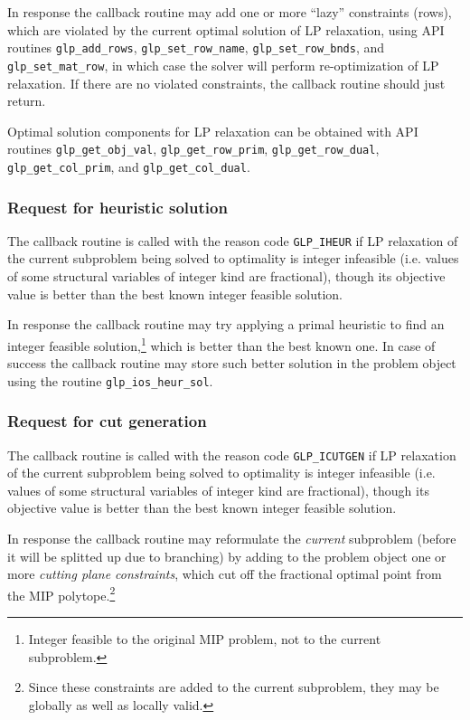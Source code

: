 In response the callback routine may add one or more ``lazy''
constraints (rows), which are violated by the current optimal solution
of LP relaxation, using API routines \verb|glp_add_rows|,
\verb|glp_set_row_name|, \verb|glp_set_row_bnds|, and
\verb|glp_set_mat_row|, in which case the solver will perform
re-optimization of LP relaxation. If there are no violated constraints,
the callback routine should just return.

Optimal solution components for LP relaxation can be obtained with API
routines \verb|glp_get_obj_val|, \verb|glp_get_row_prim|,
\verb|glp_get_row_dual|, \verb|glp_get_col_prim|, and
\verb|glp_get_col_dual|.

\subsubsection*{Request for heuristic solution}

The callback routine is called with the reason code \verb|GLP_IHEUR|
if LP relaxation of the current subproblem being solved to optimality
is integer infeasible (i.e. values of some structural variables of
integer kind are fractional), though its objective value is better than
the best known integer feasible solution.

In response the callback routine may try applying a primal heuristic
to find an integer feasible solution,\footnote{Integer feasible to the
original MIP problem, not to the current subproblem.} which is better
than the best known one. In case of success the callback routine may
store such better solution in the problem object using the routine
\verb|glp_ios_heur_sol|.

\subsubsection*{Request for cut generation}

The callback routine is called with the reason code \verb|GLP_ICUTGEN|
if LP relaxation of the current subproblem being solved to optimality
is integer infeasible (i.e. values of some structural variables of
integer kind are fractional), though its objective value is better than
the best known integer feasible solution.

In response the callback routine may reformulate the {\it current}
subproblem (before it will be splitted up due to branching) by adding to
the problem object one or more {\it cutting plane constraints}, which
cut off the fractional optimal point from the MIP
polytope.\footnote{Since these constraints are added to the current
subproblem, they may be globally as well as locally valid.}

